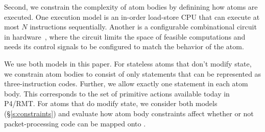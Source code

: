 Second, we constrain the complexity of atom bodies by definining how atoms are
executed. One execution model is an in-order load-store CPU that can execute at
most $N$ instructions sequentially. Another is a configurable combinational
circuit in hardware~\cite{dataflow}, where the circuit limits the space of
feasible computations and needs its control signals to be configured to match
the behavior of the atom.

We use both models in this paper. For stateless atoms that don't modify state,
we constrain atom bodies to consist of only statements that can be represented
as three-instruction codes. Further, we allow exactly one statement in each
atom body. This corresponds to the set of primitive actions available today in
P4/RMT.  For atoms that do modify state, we consider both models
(\S\ref{s:constraints}) and evaluate how atom body constraints affect whether
or not packet-processing code can be mapped onto \absmachine.
